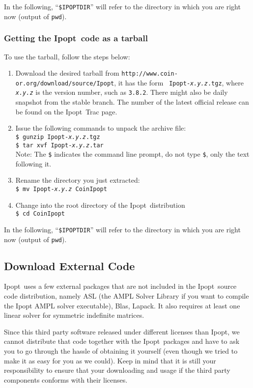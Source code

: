 \documentclass[10pt]{article}
\newcommand{\Ipopt}{{\sc Ipopt}}
\begin{document}
In the following, ``\texttt{\$IPOPTDIR}'' will refer to the directory in
which you are right now (output of \texttt{pwd}).

\subsubsection{Getting the \Ipopt\ code as a tarball}

To use the tarball, follow the steps below:
\begin{enumerate}
\item Download the desired tarball from
  \texttt{http://www.coin-or.org/download/source/Ipopt}, it has the form {\tt
    Ipopt-{\em x.y.z}.tgz}, where {\tt\em x.y.z} is the version
  number, such as {\tt 3.8.2}.  There might also be daily snapshot
  from the stable branch.  The number of the latest official release
  can be found on the \Ipopt\ Trac page.
\item Issue the following commands to unpack the archive file: \\
\texttt{\$ gunzip Ipopt-{\em x.y.z}.tgz} \\
\texttt{\$ tar xvf Ipopt-{\em x.y.z}.tar} \\
Note: The {\tt \$} indicates the command line
prompt, do not type {\tt \$}, only the text following it.
\item Rename the directory you just extracted:\\
\texttt{\$ mv Ipopt-{\em x.y.z} CoinIpopt}
\item Change into the root directory of the \Ipopt\ distribution\\
{\tt \$ cd CoinIpopt}
\end{enumerate}

In the following, ``\texttt{\$IPOPTDIR}'' will refer to the directory in
which you are right now (output of \texttt{pwd}).

\subsection{Download External Code}\label{ExternalCode}
\Ipopt\ uses a few external packages that are not included in the
\Ipopt\ source code distribution, namely ASL (the AMPL Solver Library
if you want to compile the Ipopt AMPL solver executable), Blas,
Lapack.  It also requires at least one linear solver for symmetric
indefinite matrices.

Since this third party software released under different licenses than
\Ipopt, we cannot distribute that code together with the \Ipopt\
packages and have to ask you to go through the hassle of obtaining it
yourself (even though we tried to make it as easy for you as we
could).  Keep in mind that it is still your responsibility to ensure
that your downloading and usage if the third party components conforms
with their licenses.
\end{document}
